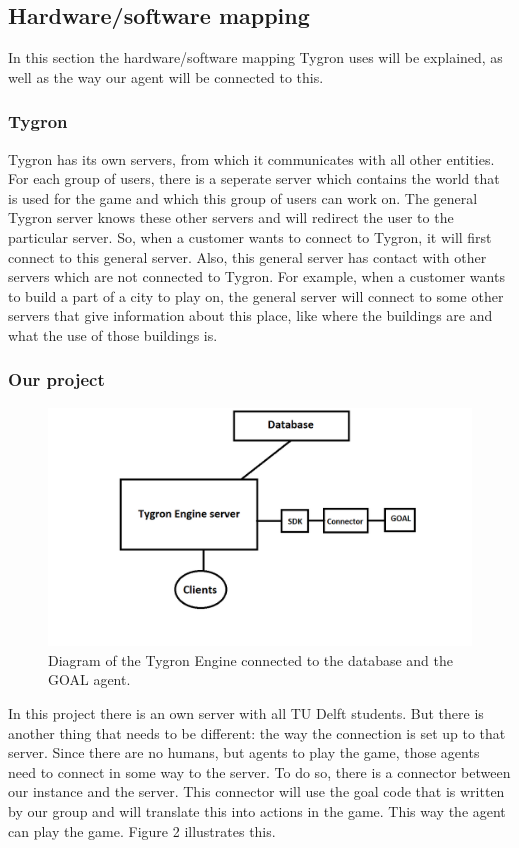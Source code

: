 \newpage
\subsection{Hardware/software mapping}
In this section the hardware/software mapping Tygron uses will be explained, as well as the way our agent will be connected to this.

\subsubsection{Tygron}
Tygron has its own servers, from which it communicates with all other entities. For each group of users, there is a seperate server which contains the world that is used for the game and which this group of users can work on. The general Tygron server knows these other servers and will redirect the user to the particular server. So, when a customer wants to connect to Tygron, it will first connect to this general server. Also, this general server has contact with other servers which are not connected to Tygron. For example, when a customer wants to build a part of a city to play on, the general server will connect to some other servers that give information about this place, like where the buildings are and what the use of those buildings is. 

\subsubsection{Our project}
\begin{figure}[h!]
  \centering
  \includegraphics[scale=0.55]{Tygrondatabase3.png}
  \caption{Diagram of the Tygron Engine connected to the database and the GOAL agent.}
  \label{fig:tygron2}
\end{figure}
In this project there is an own server with all TU Delft students. But there is another thing that needs to be different: the way the connection is set up to that server. Since there are no humans, but agents to play the game, those agents need to connect in some way to the server. To do so, there is a connector between our instance and the server. This connector will use the goal code that is written by our group and will translate this into actions in the game. This way the agent can play the game. Figure 2 illustrates this.

